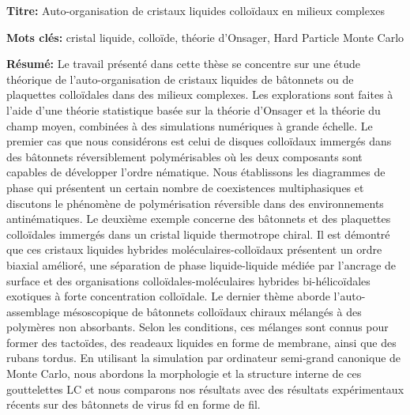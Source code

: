 \documentclass[french,12pt,a4paper]{book}
\begin{document}
\small

\begin{mdframed}[linecolor=Prune,linewidth=1]

\textbf{Titre:} Auto-organisation de cristaux liquides colloïdaux en milieux complexes

\noindent \textbf{Mots clés:} cristal liquide, colloïde, théorie d'Onsager, Hard Particle Monte Carlo

\begin{multicols}{2}
\noindent \textbf{Résumé:} Le travail présenté dans cette thèse se concentre sur une étude théorique de l'auto-organisation de cristaux liquides de bâtonnets ou de plaquettes colloïdales dans des milieux complexes. Les explorations sont faites à l'aide d'une théorie statistique basée sur la théorie d'Onsager et la théorie du champ moyen, combinées à des simulations numériques à grande échelle. Le premier cas que nous considérons est celui de disques colloïdaux immergés dans des bâtonnets réversiblement polymérisables où les deux composants sont capables de développer l'ordre nématique. Nous établissons les diagrammes de phase qui présentent un certain nombre de coexistences multiphasiques et discutons le phénomène de polymérisation réversible dans des environnements antinématiques. Le deuxième exemple concerne des bâtonnets et des plaquettes colloïdales immergés dans un cristal liquide thermotrope chiral. Il est démontré que ces cristaux liquides hybrides moléculaires-colloïdaux présentent un ordre biaxial amélioré, une séparation de phase liquide-liquide médiée par l'ancrage de surface et des organisations colloïdales-moléculaires hybrides bi-hélicoïdales exotiques à forte concentration colloïdale. Le dernier thème aborde l'auto-assemblage mésoscopique de bâtonnets colloïdaux chiraux mélangés à des polymères non absorbants. Selon les conditions, ces mélanges sont connus pour former des tactoïdes, des readeaux liquides en forme de membrane, ainsi que des rubans tordus.  En utilisant la simulation par ordinateur semi-grand canonique de Monte Carlo, nous abordons la morphologie et la structure interne de ces gouttelettes LC et nous comparons nos résultats avec des résultats expérimentaux récents sur des bâtonnets de virus fd en forme de fil.
\end{multicols}

\end{mdframed}

\vspace{8mm}
\end{document}
